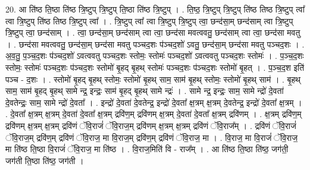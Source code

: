 \documentclass[17pt]{extarticle}
\begin{document}
20. आ ति॑ष्ठ ति॒ष्ठा ति॑ष्ठ त्रि॒ष्टुप् त्रि॒ष्टुप् ति॒ष्ठा ति॑ष्ठ त्रि॒ष्टुप् । . ति॒ष्ठ॒ त्रि॒ष्टुप् त्रि॒ष्टुप् ति॑ष्ठ तिष्ठ त्रि॒ष्टुप् त्वा᳚ त्वा त्रि॒ष्टुप् ति॑ष्ठ तिष्ठ त्रि॒ष्टुप् त्वा᳚ । . त्रि॒ष्टुप् त्वा᳚ त्वा त्रि॒ष्टुप् त्रि॒ष्टुप् त्वा॒ छन्द॑सा॒म् छन्द॑साम् त्वा त्रि॒ष्टुप् त्रि॒ष्टुप् त्वा॒ छन्द॑साम् । . त्वा॒ छन्द॑सा॒म् छन्द॑साम् त्वा त्वा॒ छन्द॑सा मवत्ववतु॒ छन्द॑साम् त्वा त्वा॒ छन्द॑सा मवतु । . छन्द॑सा मवत्ववतु॒ छन्द॑सा॒म् छन्द॑सा मवतु पञ्चद॒शः प॑ञ्चद॒शो॑ ऽवतु॒ छन्द॑सा॒म् छन्द॑सा मवतु पञ्चद॒शः । . अ॒व॒तु॒ प॒ञ्च॒द॒शः प॑ञ्चद॒शो॑ ऽवत्ववतु पञ्चद॒शः स्तोमः॒ स्तोमः॑ पञ्चद॒शो॑ ऽवत्ववतु पञ्चद॒शः स्तोमः॑ । . प॒ञ्च॒द॒शः स्तोमः॒ स्तोमः॑ पञ्चद॒शः प॑ञ्चद॒शः स्तोमो॑ बृ॒हद् बृ॒हथ् स्तोमः॑ पञ्चद॒शः प॑ञ्चद॒शः स्तोमो॑ बृ॒हत् । . प॒ञ्च॒द॒श इति॑ पञ्च - द॒शः । . स्तोमो॑ बृ॒हद् बृ॒हथ् स्तोमः॒ स्तोमो॑ बृ॒हथ् साम॒ साम॑ बृ॒हथ् स्तोमः॒ स्तोमो॑ बृ॒हथ् साम॑ । . बृ॒हथ् साम॒ साम॑ बृ॒हद् बृ॒हथ् सामे न्द्र॒ इन्द्रः॒ साम॑ बृ॒हद् बृ॒हथ् सामे न्द्रः॑ । . सामे न्द्र॒ इन्द्रः॒ साम॒ सामे न्द्रो॑ दे॒वता॑ दे॒वतेन्द्रः॒ साम॒ सामे न्द्रो॑ दे॒वता᳚ । . इन्द्रो॑ दे॒वता॑ दे॒वतेन्द्र॒ इन्द्रो॑ दे॒वता᳚ क्ष॒त्रम् क्ष॒त्रम् दे॒वतेन्द्र॒ इन्द्रो॑ दे॒वता᳚ क्ष॒त्रम् । . दे॒वता᳚ क्ष॒त्रम् क्ष॒त्रम् दे॒वता॑ दे॒वता᳚ क्ष॒त्रम् द्रवि॑ण॒म् द्रवि॑णम् क्ष॒त्रम् दे॒वता॑ दे॒वता᳚ क्ष॒त्रम् द्रवि॑णम् । . क्ष॒त्रम् द्रवि॑ण॒म् द्रवि॑णम् क्ष॒त्रम् क्ष॒त्रम् द्रवि॑णं ॅवि॒राजं॑ ॅवि॒राज॒म् द्रवि॑णम् क्ष॒त्रम् क्ष॒त्रम् द्रवि॑णं ॅवि॒राज᳚म् । . द्रवि॑णं ॅवि॒राजं॑ ॅवि॒राज॒म् द्रवि॑ण॒म् द्रवि॑णं ॅवि॒राज॒ मा वि॒राज॒म् द्रवि॑ण॒म् द्रवि॑णं ॅवि॒राज॒ मा । . वि॒राज॒ मा वि॒राजं॑ ॅवि॒राज॒ मा ति॑ष्ठ ति॒ष्ठा वि॒राजं॑ ॅवि॒राज॒ मा ति॑ष्ठ । . वि॒राज॒मिति॑ वि - राज᳚म् । . आ ति॑ष्ठ ति॒ष्ठा ति॑ष्ठ॒ जग॑ती॒ जग॑ती ति॒ष्ठा ति॑ष्ठ॒ जग॑ती । \newline
\end{document}
